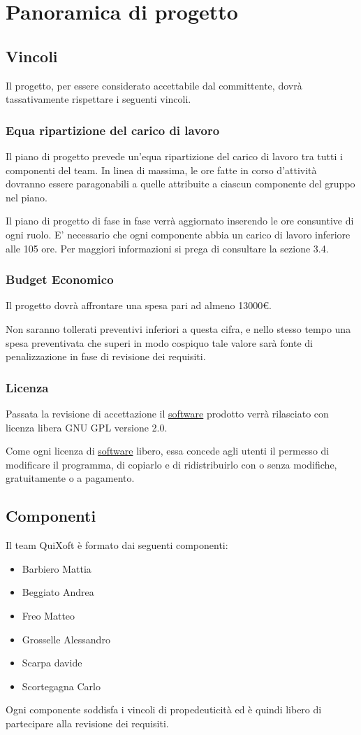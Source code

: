 \documentclass[11pt,a4paper]{article}
\begin{document}
\section{Panoramica di progetto}
\subsection{Vincoli}
Il progetto, per essere considerato accettabile dal committente, dovrà tassativamente rispettare i seguenti vincoli.
\subsubsection{Equa ripartizione del carico di lavoro}
Il piano di progetto prevede un'equa ripartizione del carico di lavoro tra tutti i componenti del team.
In linea di massima, le ore fatte in corso d'attività dovranno essere paragonabili a quelle attribuite a ciascun componente del gruppo nel piano.

Il piano di progetto di fase in fase verrà aggiornato inserendo le ore consuntive di ogni ruolo.
E' necessario che ogni componente abbia un carico di lavoro inferiore alle 105 ore. Per maggiori informazioni si prega di consultare la sezione 3.4.
\subsubsection{Budget Economico}
Il progetto dovrà affrontare una spesa pari ad almeno 13000\euro.

Non saranno tollerati preventivi inferiori a questa cifra, e nello stesso tempo una spesa preventivata che superi in modo cospiquo tale valore sarà fonte di penalizzazione in fase di revisione dei requisiti.
\subsubsection{Licenza}
Passata la revisione di accettazione il \underline{software} prodotto verrà rilasciato con licenza libera GNU GPL versione 2.0.

Come ogni licenza di \underline{software} libero, essa concede agli utenti il permes\-so di modificare il programma, di copiarlo e di ridistribuirlo con o senza modifiche, gratuitamente o a pagamento.
\subsection{Componenti}
Il team QuiXoft è formato dai seguenti componenti:
\begin{itemize}
\item Barbiero Mattia
\item Beggiato Andrea
\item Freo Matteo
\item Grosselle Alessandro
\item Scarpa davide
\item Scortegagna Carlo 
\end{itemize}
Ogni componente soddisfa i vincoli di propedeuticità ed è quindi libero di partecipare alla revisione dei requisiti.
\end{document}
